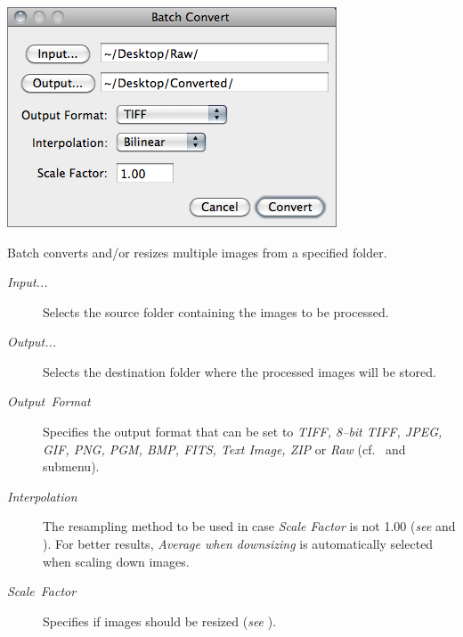 

\subsubsection[\protect\userinterface{Convert\ldots{}}]{\protect{}\label{sub:Convert...}}

\begin{minipage}[c][1\totalheight][t]{0.51\columnwidth}%
\includegraphics[scale=0.55]{images/BatchConvert}%
\end{minipage}%
\begin{minipage}[c][1\totalheight][t]{0.49\columnwidth}%
Batch converts and/or resizes multiple images from a specified folder.
\begin{description}
\item [{\emph{Input...}}] Selects the source folder containing the images
to be processed.
\item [{\emph{Output...}}] Selects the destination folder where the processed
images will be stored. \end{description}
%
\end{minipage}
\begin{description}
\item [{\emph{Output\ Format}}] Specifies the output format\emph{ }that
can be set to\emph{ TIFF, 8--bit TIFF, JPEG, GIF, PNG, PGM, BMP, FITS,
Text Image, ZIP }or\emph{ Raw }(cf.\  and
 submenu).
\item [{\emph{Interpolation}}] The resampling method to be used in case
\emph{Scale Factor} is not 1.00 (\emph{see} 
and ). For
better results, \emph{Average when downsizing} is automatically selected
when scaling down images.
\item [{\emph{Scale}\ \emph{Factor}}] Specifies if images should be resized
(\emph{see} ).
\end{description}

